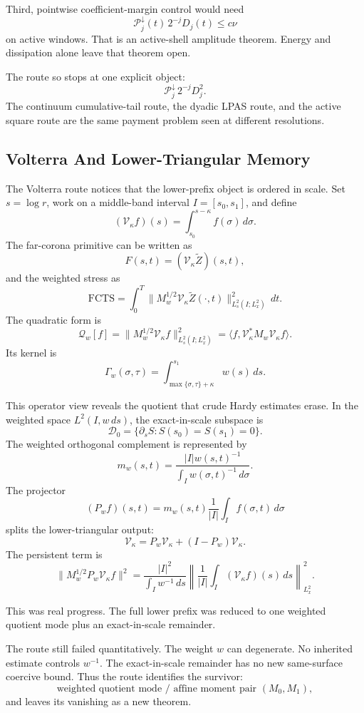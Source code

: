 Third, pointwise coefficient-margin control would need
\[
  \mathcal P_j^\downarrow(t)\,2^{-j}D_j(t)
  \le
  c\nu
\]
on active windows.
That is an active-shell amplitude theorem.
Energy and dissipation alone leave that theorem open.

The route so stops at one explicit object:
\[
  \mathcal P_j^\downarrow\,2^{-j}D_j^2 .
\]
The continuum cumulative-tail route, the dyadic LPAS route, and the active
square route are the same payment problem seen at different resolutions.

\subsection{Volterra And Lower-Triangular Memory}

The Volterra route notices that the lower-prefix object is ordered in scale.
Set \(s=\log r\), work on a middle-band interval \(I=[s_0,s_1]\), and define
\[
  (\mathcal V_\kappa f)(s)
  =
  \int_{s_0}^{s-\kappa} f(\sigma)\,d\sigma .
\]
The far-corona primitive can be written as
\[
  F(s,t)=(\mathcal V_\kappa\widetilde Z)(s,t),
\]
and the weighted stress as
\[
  \mathrm{FCTS}
  =
  \int_0^T
  \|M_w^{1/2}\mathcal V_\kappa \widetilde Z(\cdot,t)\|_{L_s^2(I;L_x^2)}^2\,dt .
\]
The quadratic form is
\[
  \mathcal Q_w[f]
  =
  \|M_w^{1/2}\mathcal V_\kappa f\|_{L_s^2(I;L_x^2)}^2
  =
  \langle f,\mathcal V_\kappa^\ast M_w\mathcal V_\kappa f\rangle .
\]
Its kernel is
\[
  \Gamma_w(\sigma,\tau)
  =
  \int_{\max\{\sigma,\tau\}+\kappa}^{s_1}w(s)\,ds .
\]

This operator view reveals the quotient that crude Hardy estimates erase.
In the weighted space \(L^2(I,w\,ds)\), the exact-in-scale subspace is
\[
  \mathcal D_0=\{\partial_s S:S(s_0)=S(s_1)=0\}.
\]
The weighted orthogonal complement is represented by
\[
  m_w(s,t)
  =
  \frac{|I|w(s,t)^{-1}}{\int_I w(\sigma,t)^{-1}\,d\sigma}.
\]
The projector
\[
  (P_w f)(s,t)
  =
  m_w(s,t)\frac1{|I|}\int_I f(\sigma,t)\,d\sigma
\]
splits the lower-triangular output:
\[
  \mathcal V_\kappa
  =
  P_w\mathcal V_\kappa+(I-P_w)\mathcal V_\kappa .
\]
The persistent term is
\[
  \|M_w^{1/2}P_w\mathcal V_\kappa f\|^2
  =
  \frac{|I|^2}{\int_I w^{-1}\,ds}
  \left\|
    \frac1{|I|}\int_I(\mathcal V_\kappa f)(s)\,ds
  \right\|_{L_x^2}^2 .
\]

This was real progress.
The full lower prefix was reduced to one weighted quotient mode plus an
exact-in-scale remainder.

The route still failed quantitatively.
The weight \(w\) can degenerate.
No inherited estimate controls \(w^{-1}\).
The exact-in-scale remainder has no new same-surface coercive bound.
Thus the route identifies the survivor:
\[
  \text{weighted quotient mode / affine moment pair }(M_0,M_1),
\]
and leaves its vanishing as a new theorem.


